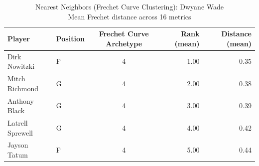 \begin{table}[t]
\caption*{
{\fontsize{20}{25} Nearest Neighbors (Frechet Curve Clustering): Dwyane Wade\fontsize{12}{15}\selectfont } \\ 
{\fontsize{14}{17}\selectfont  Mean Frechet distance across 16 metrics\fontsize{12}{15}\selectfont }
} 
\fontsize{12.0pt}{14.0pt}\selectfont
\begin{tabular*}{\linewidth}{@{\extracolsep{\fill}}llcrr}
\toprule
Player & Position & Frechet Curve Archetype & Rank (mean) & Distance (mean) \\ 
\midrule\addlinespace[2.5pt]
Dirk Nowitzki & F & 4 & 1.00 & 0.35 \\ 
Mitch Richmond & G & 4 & 2.00 & 0.38 \\ 
Anthony Black & G & 4 & 3.00 & 0.39 \\ 
Latrell Sprewell & G & 4 & 4.00 & 0.42 \\ 
Jayson Tatum & F & 4 & 5.00 & 0.44 \\ 
\bottomrule
\end{tabular*}
\end{table}

